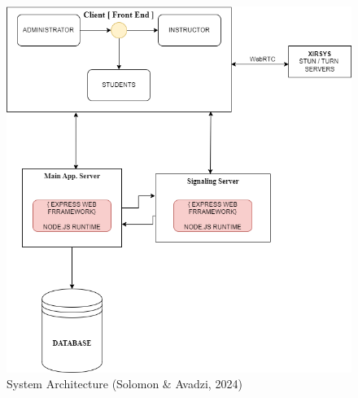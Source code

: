 \documentclass[a4paper,12pt]{article}  %
\begin{document}
\begin{figure}[H]
      \centering
      \includegraphics[width=1\textwidth]{figures/System Architecture.drawio.png}
      \caption{System Architecture (Solomon \& Avadzi, 2024)}
\end{figure}
\end{document}
